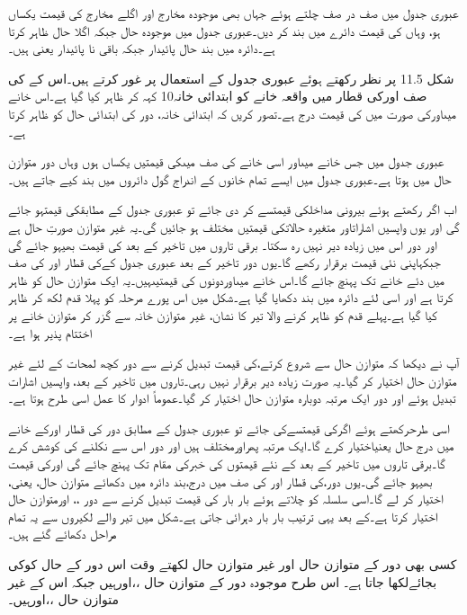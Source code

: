 عبوری جدول میں صف در صف چلتے ہوئے    جہاں بھی موجودہ مخارج  اور  اگلے مخارج  کی قیمت   یکساں ہو، وہاں  کی قیمت دائرے میں بند کر دیں۔عبوری جدول میں  موجودہ حال جبکہ  اگلا حال ظاہر کرتا ہے۔دائرہ میں بند  حال    پائیدار  جبکہ باقی نا پائیدار  یعنی    ہیں۔


شکل 11.5 پر نظر رکھتے ہوئے عبوری جدول کے استعمال پر غور کرتے ہیں۔اس کے کی صف اورکی قطار میں واقعہ خانے کو ابتدائی خانہ10 کہہ کر ظاہر کیا گیا ہے۔اس خانے میںاورکی صورت میں کی قیمت  درج ہے۔تصور کریں کہ ابتدائی خانہ، دور کی ابتدائی حال کو ظاہر کرتا ہے۔

عبوری جدول میں جس خانے میںاور اسی خانے کی صف میںکی قیمتیں یکساں ہوں وہاں دور متوازن حال میں ہوتا ہے۔عبوری جدول میں ایسے تمام خانوں کے اندراج گول دائروں میں بند کیے جاتے ہیں۔ 

اب اگر رکھتے ہوئے بیرونی مداخلکی قیمتسے  کر دی جائے تو عبوری جدول کے مطابقکی قیمتہو جائے گی اور یوں واپسیں اشاراتاور متغیرہ حالاتکی قیمتیں مختلف ہو جائیں گی۔یہ غیر متوازن صورتِ حال ہے اور دور اس میں زیادہ دیر نہیں رہ سکتا۔ برقی تاروں میں تاخیر کے بعد کی قیمت بھیہو جائے گی جبکہاپنی نئی قیمت برقرار رکھے گا۔یوں دور تاخیر کے بعد عبوری جدول کےکی قطار اور کی صف میں دئے خانے تک پہنچ جائے گا۔اس خانے میںاوردونوں کی قیمتیںہیں۔یہ ایک متوازن حال کو ظاہر کرتا ہے اور اسی لئے دائرہ میں بند دکھایا گیا ہے۔شکل میں اس پورے مرحلہ کو پہلا قدم لکھ کر ظاہر کیا گیا ہے۔پہلے قدم کو ظاہر کرنے والا تیر کا نشان، غیر متوازن خانہ سے گزر کر متوازن خانے پر اختتام پذیر ہوا ہے۔

آپ نے دیکھا کہ متوازن حال سے شروع کرتے،کی قیمت تبدیل کرنے سے دور کچھ لمحات کے لئے غیر متوازن حال اختیار کر گیا۔یہ صورت زیادہ دیر برقرار نہیں رہی۔تاروں میں تاخیر کے بعد، واپسیں اشارات تبدیل ہوئے اور دور ایک مرتبہ دوبارہ متوازن حال اختیار کر گیا۔عموماً ادوار کا عمل اسی طرح ہوتا ہے۔

اسی طرحرکھتے ہوئے  اگرکی قیمتسےکی جائے تو عبوری جدول کے مطابق دور کی قطار اورکے خانے میں درج حال یعنیاختیار کرے گا۔ایک مرتبہ پھراورمختلف ہیں اور دور اس سے نکلنے کی کوشش کرے گا۔برقی تاروں میں تاخیر کے بعد کے نئے قیمتوں کی خبرکی مقام تک پہنچ جائے گی اورکی قیمت بھیہو جائے گی۔یوں دور،کی قطار اور کی صف میں درج،بند دائرہ میں دکھائے متوازن حال، یعنی، اختیار کر لے گا۔اسی سلسلہ کو چلاتے ہوئے بار بار کی قیمت تبدیل کرنے سے دور ،،  اورمتوازن حال اختیار کرتا ہے۔کے بعد یہی ترتیب بار بار دہرائی جاتی ہے۔شکل میں تیر والے لکیروں سے یہ تمام مراحل دکھائے گئے ہیں۔

کسی بھی دور کے متوازن حال اور غیر متوازن حال لکھتے وقت اس دور کے حال کوکی بجائےلکھا جاتا ہے۔ اس طرح موجودہ دور کے متوازن حال ،،اورہیں جبکہ اس کے غیر متوازن حال ،،اورہیں۔

